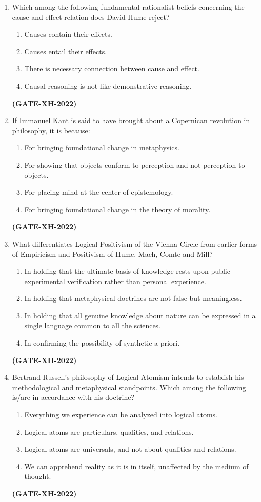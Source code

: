 \documentclass[journal]{IEEEtran}
\begin{document}
\begin{enumerate}
\item Which among the following fundamental rationalist beliefs concerning the cause and effect relation does David Hume reject?
\begin{enumerate}
\item Causes contain their effects.  
\item Causes entail their effects.  
\item There is necessary connection between cause and effect.  
\item Causal reasoning is not like demonstrative reasoning.  
\end{enumerate}
\hfill\textbf{(GATE-XH-2022)}

\item If Immanuel Kant is said to have brought about a Copernican revolution in philosophy, it is because:
\begin{enumerate}
\item For bringing foundational change in metaphysics.  
\item For showing that objects conform to perception and not perception to objects.  
\item For placing mind at the center of epistemology.  
\item For bringing foundational change in the theory of morality.  
\end{enumerate}
\hfill\textbf{(GATE-XH-2022)}

\item What differentiates Logical Positivism of the Vienna Circle from earlier forms of Empiricism and Positivism of Hume, Mach, Comte and Mill?
\begin{enumerate}
\item In holding that the ultimate basis of knowledge rests upon public experimental verification rather than personal experience.  
\item In holding that metaphysical doctrines are not false but meaningless.  
\item In holding that all genuine knowledge about nature can be expressed in a single language common to all the sciences.  
\item In confirming the possibility of synthetic a priori.  
\end{enumerate}
\hfill\textbf{(GATE-XH-2022)}

\item Bertrand Russell’s philosophy of Logical Atomism intends to establish his methodological and metaphysical standpoints. Which among the following is/are in accordance with his doctrine?
\begin{enumerate}
\item Everything we experience can be analyzed into logical atoms.  
\item Logical atoms are particulars, qualities, and relations.  
\item Logical atoms are universals, and not about qualities and relations.  
\item We can apprehend reality as it is in itself, unaffected by the medium of thought.  
\end{enumerate}
\hfill\textbf{(GATE-XH-2022)}


\end{enumerate}
\end{document}
